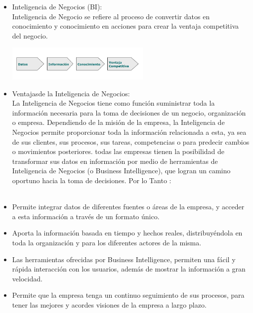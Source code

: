 \documentclass[twoside,twocolumn]{article}
\begin{document}
\begin{itemize}
\item Inteligencia de Negocios (BI): \\ 
Inteligencia de Negocio se refiere al proceso de
convertir datos en conocimiento y conocimiento en
acciones para crear la ventaja competitiva del
negocio. 
\begin{center}
	\includegraphics[width=7cm]{./Imagenes/bi} 
\end{center}

\item Ventajasde la Inteligencia de Negocios: \\
La Inteligencia de Negocios
tiene como función suministrar toda la información necesaria para la toma de
decisiones de un negocio, organización o empresa. Dependiendo de la misión de
la empresa, la Inteligencia de Negocios permite proporcionar toda la información
relacionada a esta, ya sea de sus clientes, sus procesos, sus tareas,
competencias o para predecir cambios o movimientos posteriores. 
todas las empresas tienen la posibilidad de
transformar sus datos en información por medio de herramientas de Inteligencia
de Negocios (o Business Intelligence), que logran un camino oportuno hacia la
toma de decisiones. Por lo Tanto : \\ \\ 

	\item Permite integrar datos de diferentes fuentes o áreas de la empresa, y acceder
a esta información a través de un formato único. \\
  
	\item Aporta la información basada en tiempo y hechos reales, distribuyéndola en
toda la organización y para los diferentes actores de la misma. \\

	\item Las herramientas ofrecidas por Business Intelligence, permiten una fácil y
rápida interacción con los usuarios, además de mostrar la información a gran
velocidad. \\

	\item Permite que la empresa tenga un continuo seguimiento de sus procesos, para
tener las mejores y acordes visiones de la empresa a largo plazo.\\


\end{itemize}
\end{document}
